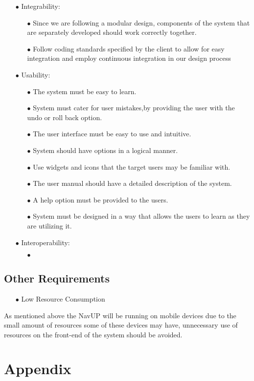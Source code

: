 \documentclass[a4paper,12pt]{article}
\begin{document}
\begin{itemize}
\item[$\bullet$] Integrability:
	\begin{itemize}
		\item[$\bullet$]Since we are following a modular design, components of the system that are
		separately developed should work  correctly together.
		\item[$\bullet$] Follow  coding standards specified by the client to allow for easy integration and employ continuous
		integration in our design process  
	\end{itemize}

\item[$\bullet$] Usability:
	\begin{itemize}
		\item[$\bullet$] The system must be easy to learn.
		\item[$\bullet$] System must cater for user mistakes,by providing the user with the undo or roll back option.
		\item[$\bullet$] The user interface must be easy to use and intuitive. 
		\item[$\bullet$] System should have options in a logical manner. 
		\item[$\bullet$] Use widgets and icons that the target users may be familiar with. 
		\item[$\bullet$] The user manual should have a detailed description of the system.
		\item[$\bullet$] A help option must be provided to the users.
		\item[$\bullet$] System must be designed in a way that allows the users to learn as they are utilizing 
		 it. 
	\end{itemize}

  
\item[$\bullet$] Interoperability:
	\begin{itemize}
		\item[$\bullet$]
	\end{itemize}
\end{itemize}
 
 
\subsection{Other Requirements}
	\begin{itemize} \item[$\bullet$] Low Resource Consumption \end{itemize}
		
		As mentioned above the NavUP will be running on mobile devices due to the small amount of resources some of these devices
		may have, unnecessary use of resources on the front-end of the system should be avoided.
	
\section{Appendix}
\newpage
\end{document}
